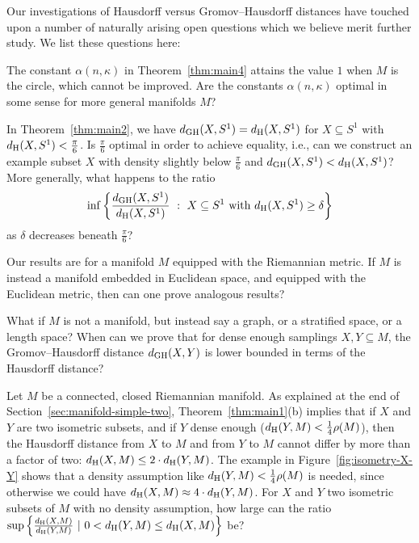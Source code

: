 \documentclass[11pt, reqno, english]{amsart}
\begin{document}
Our investigations of Hausdorff versus Gromov--Hausdorff distances have touched upon a number of naturally arising open questions which we believe merit further study.
We list these questions here:

\vspace{3mm}
\begin{question}
The constant $\alpha(n,\kappa)$ in Theorem~\ref{thm:main4} attains the value $1$ when $M$ is the circle, which cannot be improved.
Are the constants $\alpha(n,\kappa)$ optimal in some sense for more general manifolds $M$?
\end{question}

\vspace{3mm}
\begin{question}
In Theorem~\ref{thm:main2}, we have $d_{\mathrm{GH}}(X,S^1)=d_{\mathrm{H}}(X,S^1)$ for $X\subseteq S^1$ with $d_{\mathrm{H}}(X,S^1)<\frac{\pi}{6}$.
Is $\frac{\pi}{6}$ optimal in order to achieve equality, i.e., can we construct an example subset $X$ with density slightly below $\frac{\pi}{6}$ and $d_{\mathrm{GH}}(X,S^1) < d_{\mathrm{H}}(X,S^1)$?
More generally, what happens to the ratio
\[\inf\left\{\frac{d_{\mathrm{GH}}(X,S^1)}{d_{\mathrm{H}}(X,S^1)}~:~X\subseteq S^1\text{ with }d_{\mathrm{H}}(X,S^1)\ge \delta\right\}\]
as $\delta$ decreases beneath $\frac{\pi}{6}$?
\end{question}

\vspace{3mm}
\begin{question}
Our results are for a manifold $M$ equipped with the Riemannian metric.
If $M$ is instead a manifold embedded in Euclidean space, and equipped with the Euclidean metric, then can one prove analogous results?
\end{question}

\vspace{3mm}
\begin{question}
What if $M$ is not a manifold, but instead say a graph, or a stratified space, or a length space?
When can we prove that for dense enough samplings $X,Y\subseteq M$, the Gromov--Hausdorff distance $d_{\mathrm{GH}}(X,Y)$ is lower bounded in terms of the Hausdorff distance?
\end{question}

\vspace{3mm}
\begin{question}
\label{ques:not-dense}
Let $M$ be a connected, closed Riemannian manifold.
As explained at the end of Section~\ref{sec:manifold-simple-two}, 
Theorem~\ref{thm:main1}(b) implies that if $X$ and $Y$ are two isometric subsets, and if $Y$ dense enough ($d_{\mathrm{H}}(Y,M)<\frac{1}{4}\rho(M)$), then the Hausdorff distance from $X$ to $M$ and from $Y$ to $M$ cannot differ by more than a factor of two: $d_{\mathrm{H}}(X,M)\le 2\cdot d_{\mathrm{H}}(Y,M)$.
The example in Figure~\ref{fig:isometry-X-Y} shows that a density assumption like $d_{\mathrm{H}}(Y,M)<\frac{1}{4}\rho(M)$ is needed, since otherwise we could have $d_{\mathrm{H}}(X,M)\approx 4\cdot d_{\mathrm{H}}(Y,M)$.
For $X$ and $Y$ two isometric subsets of $M$ with no density assumption, how large can the ratio $\sup\left\{\tfrac{d_{\mathrm{H}}(X,M)}{d_{\mathrm{H}}(Y,M)}~|~0<d_{\mathrm{H}}(Y,M)\le d_{\mathrm{H}}(X,M)\right\}$ be?
\end{question}
\end{document}
